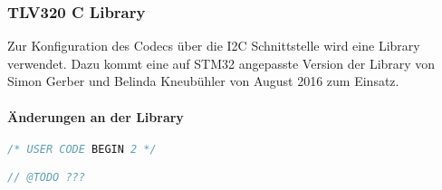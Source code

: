 \subsubsection{TLV320 C Library}
\label{sec:Library_tlv320}

Zur Konfiguration des Codecs über die I2C Schnittstelle wird eine Library verwendet.
Dazu kommt eine auf STM32 angepasste Version der Library von Simon Gerber und Belinda Kneubühler von August 2016 zum Einsatz.


\paragraph{Änderungen an der Library}


\begin{lstlisting}[language=c]
/* USER CODE BEGIN 2 */

// @TODO ???

\end{lstlisting}

